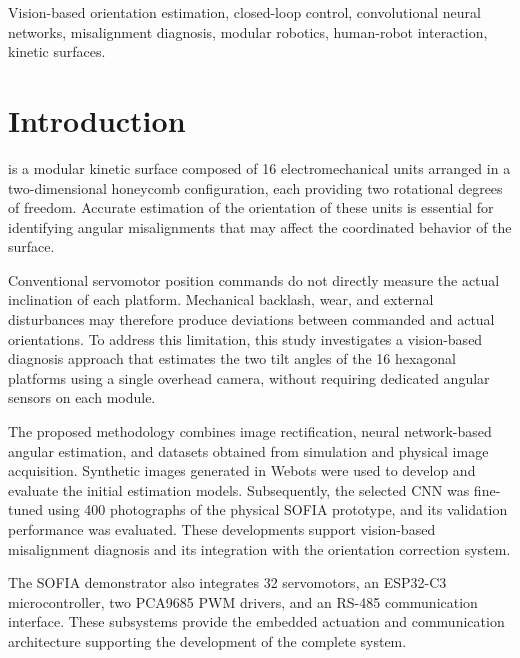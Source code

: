 \documentclass[lettersize,journal]{IEEEtran}
\begin{document}
	
	
	\begin{IEEEkeywords}
		Vision-based orientation estimation,
		closed-loop control, convolutional neural networks,
		misalignment diagnosis, modular robotics,
		human-robot interaction, kinetic surfaces.
	\end{IEEEkeywords}
	
	
	
	\section{Introduction}
	
	\label{sec:intro}
	
	 
	is a modular kinetic surface composed of 16
	electromechanical units arranged in a two-dimensional
	honeycomb configuration, each providing two rotational
	degrees of freedom. Accurate estimation of the
	orientation of these units is essential for identifying
	angular misalignments that may affect the coordinated
	behavior of the surface.
	
	Conventional servomotor position commands do not
	directly measure the actual inclination of each
	platform. Mechanical backlash, wear, and external
	disturbances may therefore produce deviations
	between commanded and actual orientations.
	To address this limitation, this study investigates
	a vision-based diagnosis approach that estimates
	the two tilt angles of the 16 hexagonal platforms
	using a single overhead camera, without requiring
	dedicated angular sensors on each module.
	
	The proposed methodology combines image
	rectification, neural network-based angular
	estimation, and datasets obtained from
	simulation and physical image acquisition.
	Synthetic images generated in Webots were
	used to develop and evaluate the initial
	estimation models. Subsequently, the
	selected CNN was fine-tuned using 400
	photographs of the physical SOFIA prototype,
	and its validation performance was evaluated.
	These developments support vision-based
	misalignment diagnosis and its integration
	with the orientation correction system.
	
	The SOFIA demonstrator also integrates 32
	servomotors, an ESP32-C3 microcontroller,
	two PCA9685 PWM drivers, and an RS-485
	communication interface. These subsystems
	provide the embedded actuation and communication
	architecture supporting the development
	of the complete system.
	
\end{document}
